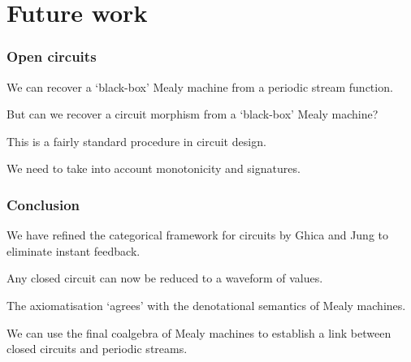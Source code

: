 \section{Future work}

\begin{frame}
    \frametitle{Open circuits}

    We can recover a `black-box' Mealy machine from a periodic stream function. 

    \pause

    But can we recover a circuit morphism from a `black-box' Mealy machine?

    \pause

    This is a fairly standard procedure in circuit design.

    \pause

    We need to take into account \alert{monotonicity} and \alert{signatures}.

\end{frame}

\begin{frame}
    \frametitle{Conclusion}

    We have refined the \alert{categorical framework} for circuits by Ghica and Jung to eliminate \alert{instant feedback}.

    \pause

    Any closed circuit can now be reduced to a \alert{waveform} of values. 

    \pause

    The axiomatisation `agrees' with the denotational semantics of \alert{Mealy machines}.

    \pause

    We can use the \alert{final coalgebra} of Mealy machines to establish a link between \alert{closed circuits} and \alert{periodic streams}.

\end{frame}